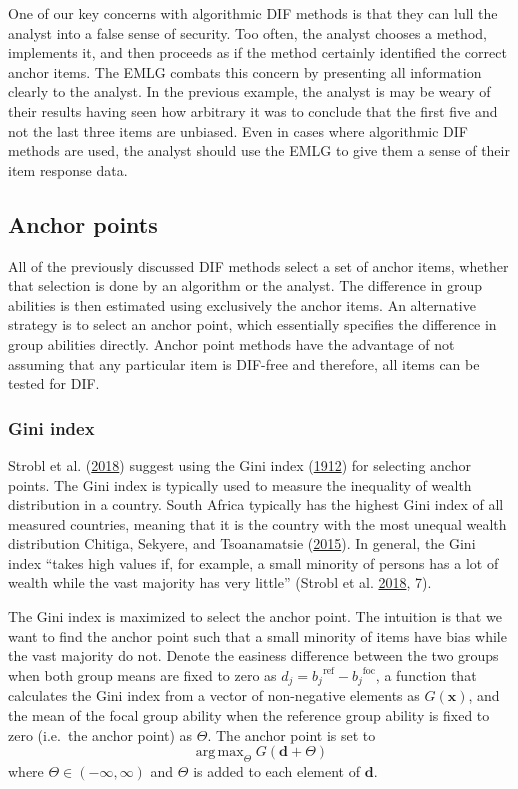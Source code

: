 \documentclass[
  11pt,
]{article}
\begin{document}
One of our key concerns with algorithmic DIF methods is that they can lull the analyst into a false sense of security. Too often, the analyst chooses a method, implements it, and then proceeds as if the method certainly identified the correct anchor items. The EMLG combats this concern by presenting all information clearly to the analyst. In the previous example, the analyst is may be weary of their results having seen how arbitrary it was to conclude that the first five and not the last three items are unbiased. Even in cases where algorithmic DIF methods are used, the analyst should use the EMLG to give them a sense of their item response data.

\hypertarget{anchor-points}{%
\subsection{Anchor points}\label{anchor-points}}

All of the previously discussed DIF methods select a set of anchor items, whether that selection is done by an algorithm or the analyst. The difference in group abilities is then estimated using exclusively the anchor items. An alternative strategy is to select an anchor point, which essentially specifies the difference in group abilities directly. Anchor point methods have the advantage of not assuming that any particular item is DIF-free and therefore, all items can be tested for DIF.

\hypertarget{gini-index}{%
\subsubsection{Gini index}\label{gini-index}}

Strobl et al. (\protect\hyperlink{ref-strobl2018anchor}{2018}) suggest using the Gini index (\protect\hyperlink{ref-gini1912variabilita}{1912}) for selecting anchor points. The Gini index is typically used to measure the inequality of wealth distribution in a country. South Africa typically has the highest Gini index of all measured countries, meaning that it is the country with the most unequal wealth distribution Chitiga, Sekyere, and Tsoanamatsie (\protect\hyperlink{ref-chitiga2015income}{2015}). In general, the Gini index \enquote{takes high values if, for example, a small minority of persons has a lot of wealth while the vast majority has very little} (Strobl et al. \protect\hyperlink{ref-strobl2018anchor}{2018}, 7).

The Gini index is maximized to select the anchor point. The intuition is that we want to find the anchor point such that a small minority of items have bias while the vast majority do not. Denote the easiness difference between the two groups when both group means are fixed to zero as \(d_j = {b_j}^\text{ref} - {b_j}^\text{foc}\), a function that calculates the Gini index from a vector of non-negative elements as \(G(\mathbf{x})\), and the mean of the focal group ability when the reference group ability is fixed to zero (i.e.~the anchor point) as \(\Theta\). The anchor point is set to
\[
\mathop\mathrm{arg\,max}_\Theta G(\mathbf{d} + \Theta)
\]
where \(\Theta \in (-\infty, \infty)\) and \(\Theta\) is added to each element of \(\mathbf{d}\).
\end{document}
